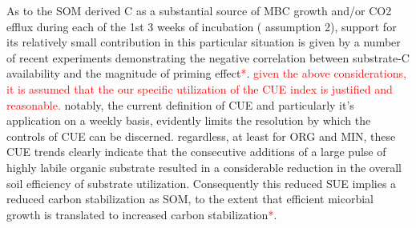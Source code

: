 \documentclass[12pt]{report}
\newcommand{\myRed}[1]{\textcolor{red}{#1}} %
\begin{document}
			As to the SOM derived C as a substantial source of MBC growth and/or CO2 efflux during each of the 1st 3 weeks of incubation ( assumption 2),  support for its relatively small contribution in this particular situation is given by a number of recent experiments demonstrating the negative correlation between substrate-C availability and the magnitude of priming effect\myRed{*}.
			\myRed{given the above considerations, it is assumed that the our specific utilization of the CUE index is justified and reasonable.}
			notably, the current definition of CUE and particularly it's application on a weekly basis, evidently limits the resolution by which the controls of CUE can be discerned. regardless, at least for ORG and MIN, these CUE trends clearly indicate that the consecutive additions of a large pulse of highly labile organic substrate resulted in a considerable reduction in the overall soil efficiency of substrate utilization. Consequently this reduced SUE implies a reduced carbon stabilization as SOM, to the extent that efficient micorbial growth is translated to increased carbon stabilization\myRed{*}.
			
\end{document}
